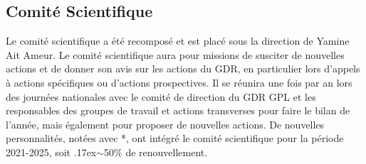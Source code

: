 \documentclass[11pt]{article}
\newcommand{\mynote}[3][black]{\textcolor{#1}{\fbox{\bfseries\sffamily\scriptsize{#2}}
{\small$\blacktriangleright$\textsf{\emph{#3}}$\blacktriangleleft$}}}
\newcommand{\pem}[1]{} %
\begin{document}
{{\begin{tabular}{|p{6cm}p{8.5cm}|}
\hline


\hline
		\end{tabular}
}

\medskip

\noindent
}



\subsection{Comité  Scientifique}
Le comité scientifique a été recomposé et est placé sous la direction de Yamine Ait Ameur.
Le comité scientifique aura pour missions de susciter de nouvelles actions et de donner son avis sur les actions du GDR, en particulier lors d'appels à actions spécifiques ou d'actions prospectives. 
Il se réunira une fois par an lors des journées nationales avec le comité de direction du GDR GPL et les responsables des groupes de travail et actions transverses pour
faire le bilan de l'année, mais également pour proposer de nouvelles actions.
De nouvelles personnalités, notées avec *, ont intégré le comité scientifique pour la période 2021-2025, soit {\raise.17ex\hbox{$\scriptstyle\sim$}}50\% de renouvellement. 
\end{document}
